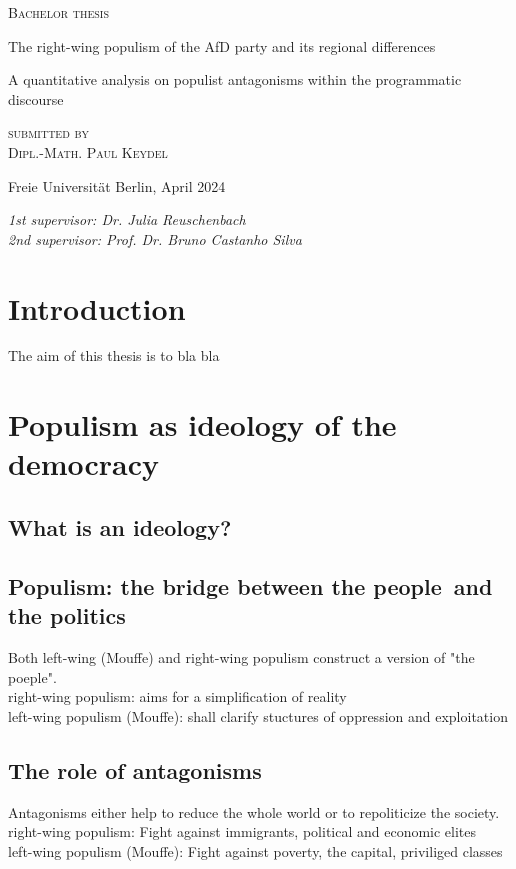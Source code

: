 \documentclass[a4paper]{scrreprt}
\begin{document}
\begin{titlepage}
\centering
{\large\textsc{Bachelor thesis}\par}
\vspace{8\baselineskip}
{\Huge The right-wing populism of the AfD party and its regional differences\par}
\vspace{2\baselineskip}
{\Large A quantitative analysis on populist antagonisms within the programmatic discourse\par}
\vspace{5\baselineskip}
{\large\textsc{submitted by\\[.5em]Dipl.-Math. Paul Keydel}\par}
\vspace{8\baselineskip}
{Freie Universität Berlin, April 2024\par}
\vfill
\raggedright
{\em 1st supervisor: Dr. Julia Reuschenbach\\}
{\em 2nd supervisor: Prof. Dr. Bruno Castanho Silva}
\end{titlepage}

\tableofcontents

\chapter{Introduction}
The aim of this thesis is to bla bla
\chapter{Populism as ideology of the democracy}
\section{What is an ideology?}
\section{Populism: the bridge between \guilsinglright the people\guilsinglleft\ and \guilsinglright the politics\guilsinglleft}
Both left-wing (Mouffe) and right-wing populism construct a version of "the poeple".\\
right-wing populism: aims for a simplification of reality\\
left-wing populism (Mouffe): shall clarify stuctures of oppression and exploitation
\section{The role of antagonisms}
Antagonisms either help to reduce the whole world or to repoliticize the society.\\
right-wing populism: Fight against immigrants, political and economic elites\\
left-wing populism (Mouffe): Fight against poverty, the capital, priviliged classes
\end{document}
